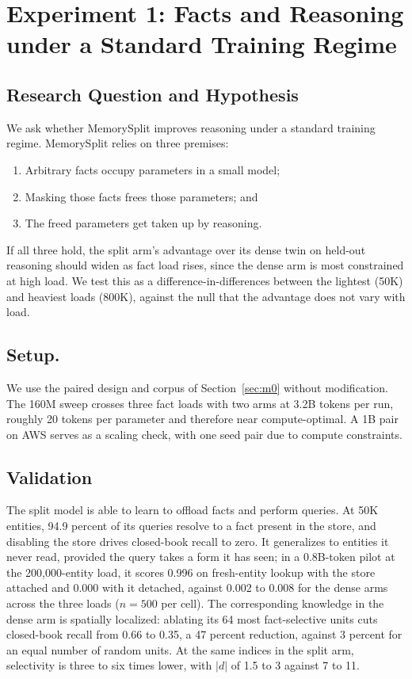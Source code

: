 \documentclass{article}
\begin{document}
\FloatBarrier


\section{Experiment 1: Facts and Reasoning under a Standard Training Regime}

\subsection{Research Question and Hypothesis}

We ask whether MemorySplit improves reasoning under a standard training regime. MemorySplit relies on three premises:
\begin{enumerate}
  \item Arbitrary facts occupy parameters in a small model;
  \item Masking those facts frees those parameters; and
  \item The freed parameters get taken up by reasoning.
\end{enumerate}
If all three hold, the split arm's advantage over its dense twin on held-out reasoning should widen as fact load rises, since the dense arm is most constrained at high load. We test this as a difference-in-differences between the lightest (50K) and heaviest loads (800K), against the null that the advantage does not vary with load.

\subsection{Setup.}

We use the paired design and corpus of Section~\ref{sec:m0} without modification. The 160M sweep crosses three fact loads with two arms at 3.2B tokens per run, roughly 20 tokens per parameter and therefore near compute-optimal. A 1B pair on AWS serves as a scaling check, with one seed pair due to compute constraints.

\subsection{Validation}

The split model is able to learn to offload facts and perform queries. At 50K entities, 94.9 percent of its queries resolve to a fact present in the store, and disabling the store drives closed-book recall to zero. It generalizes to entities it never read, provided the query takes a form it has seen; in a 0.8B-token pilot at the 200,000-entity load, it scores 0.996 on fresh-entity lookup with the store attached and 0.000 with it detached, against 0.002 to 0.008 for the dense arms across the three loads ($n = 500$ per cell). The corresponding knowledge in the dense arm is spatially localized: ablating its 64 most fact-selective units cuts closed-book recall from 0.66 to 0.35, a 47 percent reduction, against 3 percent for an equal number of random units. At the same indices in the split arm, selectivity is three to six times lower, with $|d|$ of 1.5 to 3 against 7 to 11.
\end{document}
